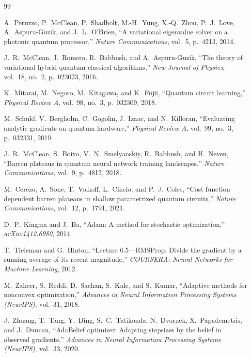 \documentclass[11pt,a4paper]{article}
\begin{document}
\begin{thebibliography}{99}

A.~Peruzzo, P.~McClean, P.~Shadbolt, M.-H.~Yung, X.-Q.~Zhou, P.~J.~Love, A.~Aspuru-Guzik, and J.~L.~O'Brien,
\newblock ``A variational eigenvalue solver on a photonic quantum processor,''
\newblock \emph{Nature Communications}, vol.~5, p.~4213, 2014.

J.~R.~McClean, J.~Romero, R.~Babbush, and A.~Aspuru-Guzik,
\newblock ``The theory of variational hybrid quantum-classical algorithms,''
\newblock \emph{New Journal of Physics}, vol.~18, no.~2, p.~023023, 2016.

K.~Mitarai, M.~Negoro, M.~Kitagawa, and K.~Fujii,
\newblock ``Quantum circuit learning,''
\newblock \emph{Physical Review A}, vol.~98, no.~3, p.~032309, 2018.

M.~Schuld, V.~Bergholm, C.~Gogolin, J.~Izaac, and N.~Killoran,
\newblock ``Evaluating analytic gradients on quantum hardware,''
\newblock \emph{Physical Review A}, vol.~99, no.~3, p.~032331, 2019.

J.~R.~McClean, S.~Boixo, V.~N.~Smelyanskiy, R.~Babbush, and H.~Neven,
\newblock ``Barren plateaus in quantum neural network training landscapes,''
\newblock \emph{Nature Communications}, vol.~9, p.~4812, 2018.

M.~Cerezo, A.~Sone, T.~Volkoff, L.~Cincio, and P.~J.~Coles,
\newblock ``Cost function dependent barren plateaus in shallow parametrized quantum circuits,''
\newblock \emph{Nature Communications}, vol.~12, p.~1791, 2021.

D.~P.~Kingma and J.~Ba,
\newblock ``Adam: A method for stochastic optimization,''
\newblock \emph{arXiv:1412.6980}, 2014.

T.~Tieleman and G.~Hinton,
\newblock ``Lecture 6.5---RMSProp: Divide the gradient by a running average of its recent magnitude,''
\newblock \emph{COURSERA: Neural Networks for Machine Learning}, 2012.

M.~Zaheer, S.~Reddi, D.~Sachan, S.~Kale, and S.~Kumar,
\newblock ``Adaptive methods for nonconvex optimization,''
\newblock \emph{Advances in Neural Information Processing Systems (NeurIPS)}, vol.~31, 2018.

J.~Zhuang, T.~Tang, Y.~Ding, S.~C.~Tatikonda, N.~Dvornek, X.~Papademetris, and J.~Duncan,
\newblock ``AdaBelief optimizer: Adapting stepsizes by the belief in observed gradients,''
\newblock \emph{Advances in Neural Information Processing Systems (NeurIPS)}, vol.~33, 2020.


\end{thebibliography}
\end{document}
